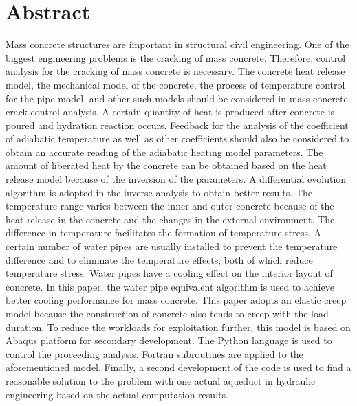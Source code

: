 \documentclass[article, A4, 11pt]{llncs}%
\begin{document}
\section*{Abstract}
Mass concrete structures are important in structural civil engineering. One of the biggest engineering problems is the cracking of mass concrete. Therefore, control analysis for the cracking of mass concrete is necessary. The concrete heat release model, the mechanical model of the concrete, the process of temperature control for the pipe model, and other such models should be considered in mass concrete crack control analysis. A certain quantity of heat is produced after concrete is poured and hydration reaction occurs, Feedback for the analysis of the coefficient of adiabatic temperature as well as other coefficients should also be considered to obtain an accurate reading of the adiabatic heating model parameters. The amount of liberated heat by the concrete can be obtained based on the heat release model because of the inversion of the parameters. A differential evolution algorithm is adopted in the inverse analysis to obtain better results.  The temperature range varies between the inner and outer concrete because of the heat release in the concrete and the changes in the external environment. The difference in temperature facilitates the formation of temperature stress. A certain number of water pipes are usually installed to prevent the temperature difference and to eliminate the temperature effects, both of which reduce temperature stress. Water pipes have a cooling effect on the interior layout of concrete. In this paper, the water pipe equivalent algorithm is used to achieve better cooling performance for mass concrete.  This paper adopts an elastic creep model because the construction of concrete also tends to creep with the load duration. To reduce the workloads for exploitation further, this model is based on Abaqus platform for secondary development. The Python language is used to control the proceeding analysis. Fortran subroutines are applied to the aforementioned model. Finally, a second development of the code is used to find a reasonable solution to the problem with one actual aqueduct in hydraulic engineering based on the actual computation results.
\end{document}
